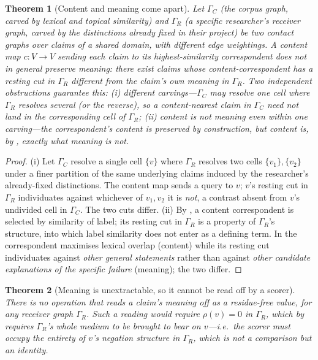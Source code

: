 \documentclass[11pt,twocolumn,a4paper]{article}
\theoremstyle{frathm}
\newtheorem{theorem}{Theorem}[section]
\theoremstyle{definition}
\theoremstyle{remark}
\newcommand{\Gph}{\Gamma}
\newcommand{\V}{V}
\newcommand{\res}{\rho}
\begin{document}
\begin{theorem}[Content and meaning come apart]
\label{thm:no-cognate}
Let $\Gph_C$ (the corpus graph, carved by lexical and topical similarity)
and $\Gph_R$ (a specific researcher's receiver graph, carved by the
distinctions already fixed in their project) be two contact graphs over
claims of a shared domain, with different edge weightings. A content map
$c:\V\to\V$ sending each claim to its highest-similarity correspondent
does not in general preserve meaning: there exist claims whose
content-correspondent has a resting cut in $\Gph_R$ different from the
claim's own meaning in $\Gph_R$. Two independent obstructions guarantee
this: \textup{(i)} \emph{different carvings}---$\Gph_C$ may resolve one
cell where $\Gph_R$ resolves several (or the reverse), so a
content-nearest claim in $\Gph_C$ need not land in the corresponding cell
of $\Gph_R$; \textup{(ii)} \emph{content is not meaning even within one
carving}---the correspondent's content is preserved by construction, but
content is, by , exactly what meaning is not.
\end{theorem}

\begin{proof}
(i) Let $\Gph_C$ resolve a single cell $\{v\}$ where $\Gph_R$ resolves two
cells $\{v_1\},\{v_2\}$ under a finer partition of the same underlying
claims induced by the researcher's already-fixed distinctions. The
content map sends a query to $v$; $v$'s resting cut in $\Gph_R$
individuates against whichever of $v_1,v_2$ it is \emph{not}, a contrast
absent from $v$'s undivided cell in $\Gph_C$. The two cuts differ. (ii)
By , a content correspondent is selected by
similarity of label; its resting cut in $\Gph_R$ is a property of
$\Gph_R$'s structure, into which label similarity does not enter as a
defining term. In  the correspondent maximises
lexical overlap (content) while its resting cut individuates against
\emph{other general statements} rather than against \emph{other candidate
explanations of the specific failure} (meaning); the two differ.
\end{proof}

\begin{theorem}[Meaning is unextractable, so it cannot be read off by a
scorer]
\label{thm:unextractable}
There is no operation that reads a claim's meaning off as a
residue-free value, for any receiver graph $\Gph_R$. Such a reading would
require $\res(v)=0$ in $\Gph_R$, which by 
requires $\Gph_R$'s whole medium to be brought to bear on $v$---i.e.\ the
scorer must occupy the entirety of $v$'s negation structure in
$\Gph_R$, which is not a comparison but an identity.
\end{theorem}
\end{document}
